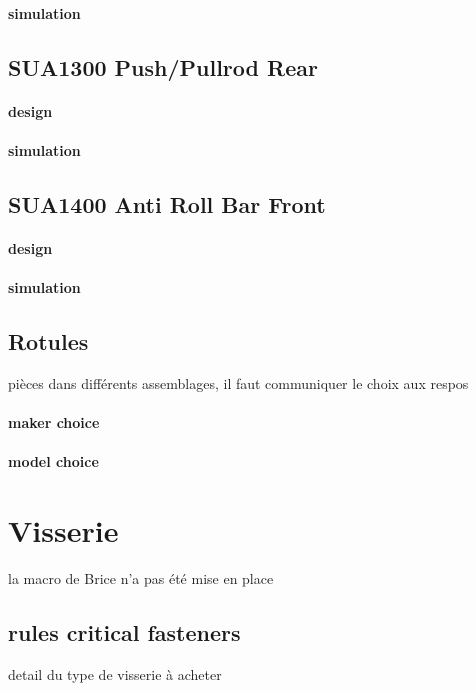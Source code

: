 		\paragraph{simulation} 
	\subsection*{SU\textunderscore A1300 Push/Pullrod Rear} 
 \par 
		\paragraph{design} 
		\paragraph{simulation} 
	\subsection*{SU\textunderscore A1400 Anti Roll Bar Front} 
 \par 
		\paragraph{design} 
		\paragraph{simulation} 
	\subsection*{Rotules} 
 \par pièces dans différents assemblages, il faut communiquer le choix aux respos
		\paragraph{maker choice} 
		\paragraph{model choice} 
\newpage 
 \section*{Visserie} 
 \par la macro de Brice n'a pas été mise en place
	\subsection*{rules critical fasteners} 
 \par detail du type de visserie à acheter

